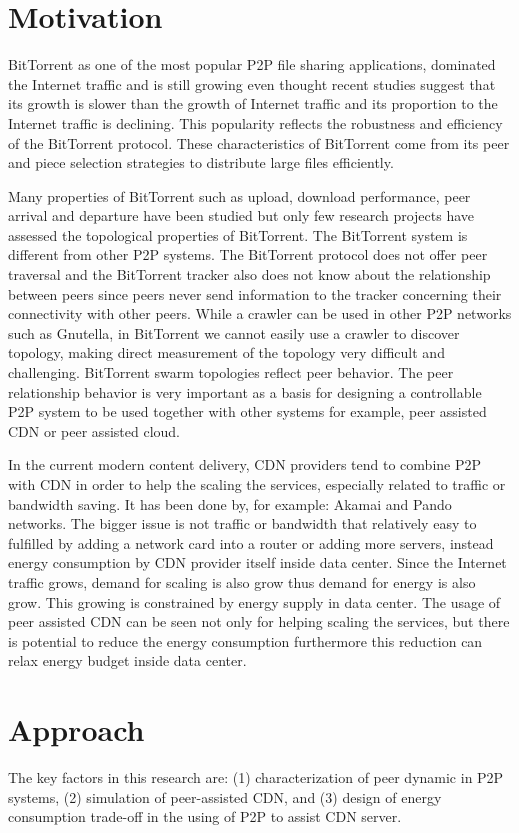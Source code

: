\section{Motivation}
BitTorrent as one of the most popular P2P file sharing applications, dominated the Internet traffic and is still growing even thought recent studies suggest that its growth is slower than the growth of Internet traffic and its proportion to the Internet traffic is declining.
This popularity reflects the robustness and efficiency of the BitTorrent protocol.
These characteristics of BitTorrent come from its peer and piece selection strategies to distribute large files efficiently.  

Many properties of BitTorrent such as upload, download performance, peer arrival and departure have been studied but only few research projects have assessed the topological properties of BitTorrent.  
The BitTorrent system is different from other P2P systems. 
The BitTorrent protocol does not offer peer traversal and the BitTorrent tracker also does not know about the relationship between peers since peers never send information to the tracker concerning their connectivity with other peers.  
While a crawler can be used in other P2P networks such as Gnutella, in BitTorrent we cannot easily use a crawler to discover topology, making direct measurement of the topology very difficult and challenging. 
BitTorrent swarm topologies reflect peer behavior.
The peer relationship behavior is very important as a basis for designing a controllable P2P system to be used together with other systems for example, peer assisted CDN or peer assisted cloud. 

In the current modern content delivery, CDN providers tend to combine P2P with CDN in order to help the scaling the services, especially related to traffic or bandwidth saving.
It has been done by, for example: Akamai and Pando networks.
The bigger issue is not traffic or bandwidth that relatively easy to fulfilled by adding a network card into a router or adding more servers, instead energy consumption by CDN provider itself inside data center.
Since the Internet traffic grows, demand for scaling is also grow thus demand for energy is also grow.  
This growing is constrained by energy supply in data center.
The usage of peer assisted CDN can be seen not only for helping scaling the services, but there is potential to reduce the energy consumption furthermore this reduction can relax energy budget inside data center. 


\section{Approach}
The key factors in this research are: (1) characterization of peer dynamic in P2P systems, (2) simulation of peer-assisted CDN, and (3) design of energy consumption trade-off in the using of P2P to assist CDN server.


